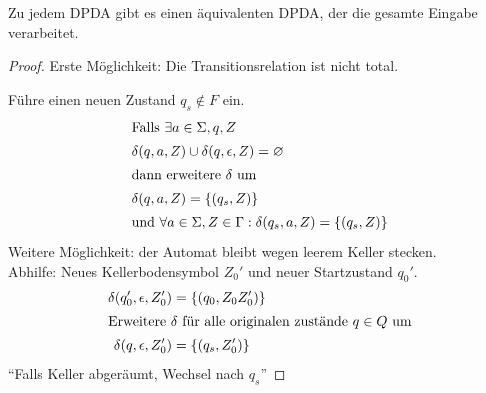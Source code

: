 \begin{lemma}[name={[\acs*{DPDA}, der gesamte Eingabe verarbeitet]}]
	\label{lem:DPDA ges. Eingabe}
	Zu jedem \ac{DPDA} gibt es einen äquivalenten \ac{DPDA}, der die gesamte Eingabe verarbeitet.
\end{lemma}
\begin{proof}
    Erste Möglichkeit: Die Transitionsrelation ist nicht total.

	Führe einen neuen Zustand $q_s\notin F$ ein.
	\begin{align*}
	\shortintertext{Falls $\exists a\in\Sigma, q, Z$}
		\delta(q,a,Z) &\cup \delta(q,\epsilon,Z) = \varnothing\\
	\shortintertext{dann erweitere $\delta$ um}
		\delta(q,a,Z) &= \{ (q_s,Z) \}\\
	\shortintertext{und $\forall a\in\Sigma, Z\in \Gamma: \delta(q_s,a,Z) = \{(q_s,Z)\}$}
	\end{align*}
	Weitere Möglichkeit: der Automat bleibt wegen leerem Keller stecken.\\
	Abhilfe: Neues Kellerbodensymbol $Z_0'$ und neuer Startzustand $q_0'$.
	\begin{align*}
		\delta(q_0',\epsilon,Z_0') &= \{(q_0,Z_0Z_0')\}\\
	\shortintertext{Erweitere $\delta$ für alle originalen zustände $q\in Q$ um}
		\delta(q,\epsilon,Z_0') &= \{(q_s,Z_0')\}
	\end{align*}
	"`Falls Keller abgeräumt, Wechsel nach $q_s$"'
\end{proof}

